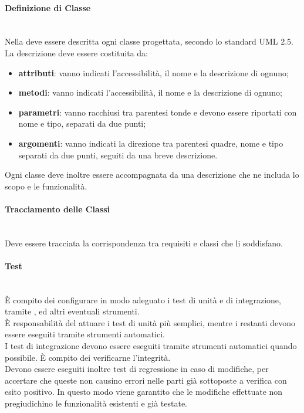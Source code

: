 \paragraph{Definizione di Classe}\mbox{}\\
Nella \DefinizioneDiProdotto{} deve essere descritta ogni classe progettata, secondo lo standard UML 2.5. La descrizione deve essere costituita da:
\begin{itemize}
	\item \textbf{attributi}: vanno indicati l'accessibilità, il nome e la descrizione di ognuno;
	\item \textbf{metodi}: vanno indicati l'accessibilità, il nome e la descrizione di ognuno;
	\item \textbf{parametri}: vanno racchiusi tra parentesi tonde e devono essere riportati con nome e tipo, separati da due punti;
	\item \textbf{argomenti}: vanno indicati la direzione tra parentesi quadre, nome e tipo separati da due punti, seguiti da una breve descrizione.
\end{itemize}
Ogni classe deve inoltre essere accompagnata da una descrizione che ne includa lo scopo e le funzionalità.

\paragraph{Tracciamento delle Classi}\mbox{}\\
Deve essere tracciata la corrispondenza tra requisiti e classi che li soddisfano.

\paragraph{Test}\mbox{}\\
\`{E} compito dei \Progettisti{} configurare in modo adeguato i test di unità e di integrazione, tramite ,  ed altri eventuali strumenti.\\
\`{E} responsabilità del \Programmatore{} attuare i test di unità più semplici, mentre i restanti devono essere eseguiti tramite strumenti automatici.\\
I test di integrazione devono essere eseguiti tramite strumenti automatici quando possibile. \`{E} compito dei \Verificatori{} verificarne l'integrità.\\
Devono essere eseguiti inoltre test di regressione in caso di modifiche, per accertare che queste non causino errori nelle parti già sottoposte a verifica con esito positivo. In questo modo viene garantito che le modifiche effettuate non pregiudichino le funzionalità esistenti e già testate.

